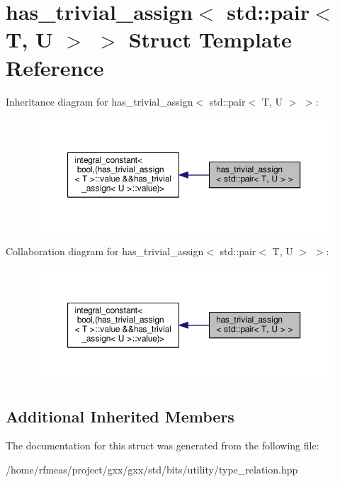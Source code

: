 \hypertarget{structhas__trivial__assign_3_01std_1_1pair_3_01T_00_01U_01_4_01_4}{}\section{has\+\_\+trivial\+\_\+assign$<$ std\+:\+:pair$<$ T, U $>$ $>$ Struct Template Reference}
\label{structhas__trivial__assign_3_01std_1_1pair_3_01T_00_01U_01_4_01_4}


Inheritance diagram for has\+\_\+trivial\+\_\+assign$<$ std\+:\+:pair$<$ T, U $>$ $>$\+:
\nopagebreak
\begin{figure}[H]
\begin{center}
\leavevmode
\includegraphics[width=350pt]{structhas__trivial__assign_3_01std_1_1pair_3_01T_00_01U_01_4_01_4__inherit__graph}
\end{center}
\end{figure}


Collaboration diagram for has\+\_\+trivial\+\_\+assign$<$ std\+:\+:pair$<$ T, U $>$ $>$\+:
\nopagebreak
\begin{figure}[H]
\begin{center}
\leavevmode
\includegraphics[width=350pt]{structhas__trivial__assign_3_01std_1_1pair_3_01T_00_01U_01_4_01_4__coll__graph}
\end{center}
\end{figure}
\subsection*{Additional Inherited Members}


The documentation for this struct was generated from the following file\+:\begin{DoxyCompactItemize}
\item 
/home/rfmeas/project/gxx/gxx/std/bits/utility/type\+\_\+relation.\+hpp\end{DoxyCompactItemize}

